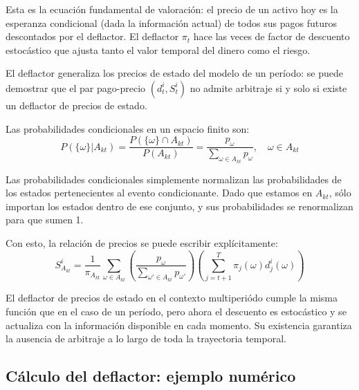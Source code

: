 \documentclass[12pt]{article}
\begin{document}
\begin{intuicionmat}
Esta es la ecuaci\'on fundamental de valoraci\'on: el precio de un activo hoy es la esperanza condicional (dada la informaci\'on actual) de todos sus pagos futuros descontados por el deflactor. El deflactor $\pi_t$ hace las veces de factor de descuento estoc\'astico que ajusta tanto el valor temporal del dinero como el riesgo.
\end{intuicionmat}

El deflactor generaliza los precios de estado del modelo de un per\'iodo: se puede demostrar que el par pago-precio $(d_t^i, S_t^i)$ no admite arbitraje si y solo si existe un deflactor de precios de estado.

Las probabilidades condicionales en un espacio finito son:
\begin{equation}
    P(\{\omega\} | A_{kt}) = \frac{P(\{\omega\} \cap A_{kt})}{P(A_{kt})} = \frac{p_\omega}{\sum_{\omega \in A_{kt}} p_\omega}, \quad \omega \in A_{kt}
\end{equation}

\begin{intuicionmat}
Las probabilidades condicionales simplemente normalizan las probabilidades de los estados pertenecientes al evento condicionante. Dado que estamos en $A_{kt}$, s\'olo importan los estados dentro de ese conjunto, y sus probabilidades se renormalizan para que sumen 1.
\end{intuicionmat}

Con esto, la relaci\'on de precios se puede escribir expl\'icitamente:
\begin{equation}
    S^i_{A_{kt}} = \frac{1}{\pi_{A_{kt}}} \sum_{\omega \in A_{kt}} \left(\frac{p_\omega}{\sum_{\omega' \in A_{kt}} p_{\omega'}}\right) \left(\sum_{j=t+1}^{T} \pi_j(\omega) d_j^i(\omega)\right)
\end{equation}

\begin{intuicion}
El deflactor de precios de estado en el contexto multiperi\'odo cumple la misma funci\'on que en el caso de un per\'iodo, pero ahora el descuento es estoc\'astico y se actualiza con la informaci\'on disponible en cada momento. Su existencia garantiza la ausencia de arbitraje a lo largo de toda la trayectoria temporal.
\end{intuicion}

\subsection{C\'alculo del deflactor: ejemplo num\'erico}
\end{document}
